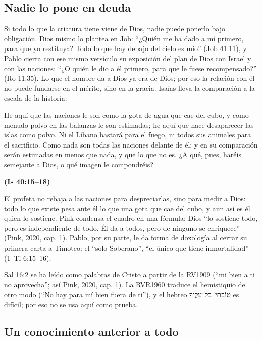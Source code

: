 \documentclass[11pt,letterpaper]{article}
\newcommand{\heb}[1]{\mbox{\foreignlanguage{hebrew}{#1}}}
\newcommand{\fuente}[1]{\par\hfill{\upshape\bfseries\small\textcolor{azul}{#1}}}
\begin{document}
\subsection{Nadie lo pone en deuda}

Si todo lo que la criatura tiene viene de Dios, nadie puede ponerlo bajo obligación. Dios mismo lo plantea en Job: ``¿Quién me ha dado a mí primero, para que yo restituya? Todo lo que hay debajo del cielo es mío'' (Job 41:11), y Pablo cierra con ese mismo versículo su exposición del plan de Dios con Israel y con las naciones: ``¿O quién le dio a él primero, para que le fuese recompensado?'' (Ro 11:35). Lo que el hombre da a Dios ya era de Dios; por eso la relación con él no puede fundarse en el mérito, sino en la gracia. Isaías lleva la comparación a la escala de la historia:

\begin{cita}He aquí que las naciones le son como la gota de agua que cae del cubo, y como menudo polvo en las balanzas le son estimadas; he aquí que hace desaparecer las islas como polvo. Ni el Líbano bastará para el fuego, ni todos sus animales para el sacrificio. Como nada son todas las naciones delante de él; y en su comparación serán estimadas en menos que nada, y que lo que no es. ¿A qué, pues, haréis semejante a Dios, o qué imagen le compondréis?\fuente{(Is 40:15--18)}\end{cita}

El profeta no rebaja a las naciones para despreciarlas, sino para medir a Dios: todo lo que existe pesa ante él lo que una gota que cae del cubo, y aun así es él quien lo sostiene. Pink condensa el cuadro en una fórmula: Dios ``lo sostiene todo, pero es independiente de todo. Él da a todos, pero de ninguno se enriquece'' (Pink, 2020, cap. 1). Pablo, por su parte, le da forma de doxología al cerrar su primera carta a Timoteo: el ``solo Soberano'', ``el único que tiene inmortalidad'' (1~Ti 6:15--16).

\begin{nota}[Precisión]
Sal 16:2 se ha leído como palabras de Cristo a partir de la RV1909 (``mi bien a ti no aprovecha''; así Pink, 2020, cap. 1). La RVR1960 traduce el hemistiquio de otro modo (``No hay para mí bien fuera de ti''), y el hebreo \heb{טוֹבָתִי בַּל־עָלֶיךָ} es difícil; por eso no se usa aquí como prueba.
\end{nota}

\subsection{Un conocimiento anterior a todo}
\end{document}
